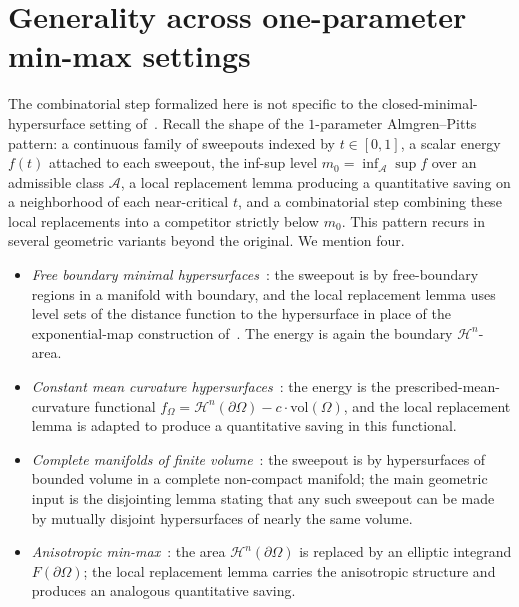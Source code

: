 \section{Generality across one-parameter min-max settings}
\label{sec:integration-generality}

The combinatorial step formalized here is not specific to the
closed-minimal-hypersurface setting of~\cite{DLT13}. Recall the
shape of the $1$-parameter Almgren--Pitts pattern: a continuous
family of sweepouts indexed by $t \in [0,1]$, a scalar energy
$f(t)$ attached to each sweepout, the inf-sup level
$m_0 = \inf_{\mathcal{A}} \sup f$ over an admissible class
$\mathcal{A}$, a local replacement lemma producing a
quantitative saving on a neighborhood of each near-critical
$t$, and a combinatorial step combining these local
replacements into a competitor strictly below $m_0$. This
pattern recurs in several geometric variants beyond the
original. We mention four.

\begin{itemize}
\item \emph{Free boundary minimal hypersurfaces}~\cite{LZ21}:
  the sweepout is by free-boundary regions in a manifold with
  boundary, and the local replacement lemma uses level sets of
  the distance function to the hypersurface in place of the
  exponential-map construction of~\cite{DLT13}. The energy is
  again the boundary $\mathcal{H}^n$-area.
\item \emph{Constant mean curvature
  hypersurfaces}~\cite{ZZ19}: the energy is the
  prescribed-mean-curvature functional
  $f_\Omega = \mathcal{H}^n(\partial \Omega) - c \cdot
  \mathrm{vol}(\Omega)$, and the local replacement lemma is
  adapted to produce a quantitative saving in this functional.
\item \emph{Complete manifolds of finite
  volume}~\cite{ChL19}: the sweepout is by hypersurfaces of
  bounded volume in a complete non-compact manifold; the main
  geometric input is the disjointing lemma stating that any
  such sweepout can be made by mutually disjoint hypersurfaces
  of nearly the same volume.
\item \emph{Anisotropic min-max}~\cite{DDL24}: the area
  $\mathcal{H}^n(\partial \Omega)$ is replaced by an elliptic
  integrand $F(\partial \Omega)$; the local replacement lemma
  carries the anisotropic structure and produces an analogous
  quantitative saving.
\end{itemize}

